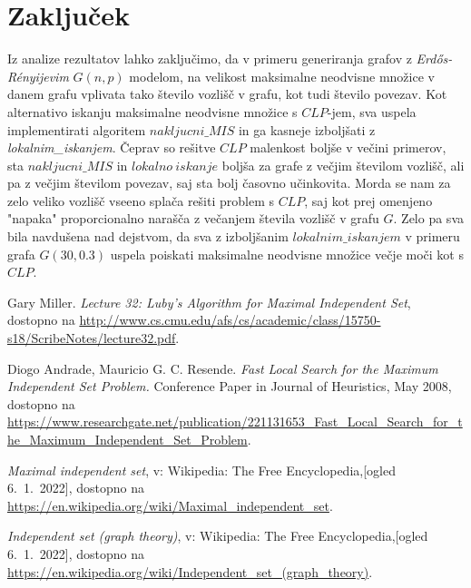 \documentclass[a4paper, 12pt]{article}
\begin{document}
\newpage
\section{Zaključek}

Iz analize rezultatov lahko zaključimo, da v primeru generiranja grafov z \textit{Erdős-Rényijevim} $G(n, p)$ modelom, na velikost maksimalne neodvisne množice v danem grafu
vplivata tako število vozlišč v grafu, kot tudi število povezav. Kot alternativo iskanju maksimalne neodvisne množice s $CLP$-jem, sva uspela implementirati algoritem $nakljucni\_MIS$
in ga kasneje izboljšati z \textit{lokalnim\_iskanjem}. Čeprav so rešitve $CLP$ malenkost boljše v večini primerov, sta $nakljucni\_MIS$ in $lokalno\ iskanje$ boljša za grafe z večjim številom vozlišč,
ali pa z večjim številom povezav, saj sta bolj časovno učinkovita. Morda se nam za zelo veliko vozlišč vseeno splača rešiti problem s $CLP$, saj kot prej omenjeno "napaka" proporcionalno narašča z večanjem števila vozlišč v grafu $G$.
Zelo pa sva bila navdušena nad dejstvom, da sva z izboljšanim $lokalnim\_iskanjem$ v primeru grafa $G(30,0.3)$ uspela poiskati maksimalne neodvisne množice večje moči kot s $CLP$.


\newpage

\begin{thebibliography}{9}    

    Gary Miller.
    \textit{Lecture 32: Luby’s Algorithm for Maximal Independent Set}, dostopno na \url{http://www.cs.cmu.edu/afs/cs/academic/class/15750-s18/ScribeNotes/lecture32.pdf}.

    Diogo Andrade, Mauricio G. C. Resende.
    \textit{Fast Local Search for the Maximum Independent Set Problem.} Conference Paper in Journal of Heuristics, May 2008, 
    dostopno na \url{https://www.researchgate.net/publication/221131653_Fast_Local_Search_for_the_Maximum_Independent_Set_Problem}.

    \textit{Maximal independent set}, v: Wikipedia: The Free Encyclopedia,[ogled 6.~1.~2022], dostopno na \url{https://en.wikipedia.org/wiki/Maximal_independent_set}.

    \textit{Independent set (graph theory)}, v: Wikipedia: The Free Encyclopedia,[ogled 6.~1.~2022], dostopno na \url{https://en.wikipedia.org/wiki/Independent_set_(graph_theory)}.

    
\end{thebibliography}
\end{document}
